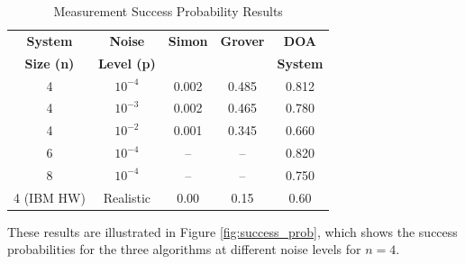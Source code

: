 \documentclass[journal]{IEEEtran}
\begin{document}
\begin{table}[htbp]
\caption{{Measurement Success Probability Results}}
\label{tab:results}
\centering
\begin{tabular}{|c|c|c|c|c|}
\hline
\textbf{System} & \textbf{Noise} & \textbf{Simon} & \textbf{Grover} & \textbf{DOA} \\
\textbf{Size (n)} & \textbf{Level (p)} &  &  & \textbf{System} \\
\hline
4 & $10^{-4}$ & 0.002 & 0.485 & 0.812 \\
\hline
4 & $10^{-3}$ & 0.002 & 0.465 & 0.780 \\
\hline
4 & $10^{-2}$ & 0.001 & 0.345 & 0.660 \\
\hline
6 & $10^{-4}$ & -- & -- & 0.820 \\
\hline
8 & $10^{-4}$ & -- & -- & 0.750 \\
\hline
{4 (IBM HW)} & {Realistic} & {0.00} & {0.15} & {0.60} \\
\hline
\end{tabular}
\end{table}

These results are illustrated in Figure \ref{fig:success_prob}, which shows the success probabilities for the three algorithms at different noise levels for $n=4$.
\end{document}
